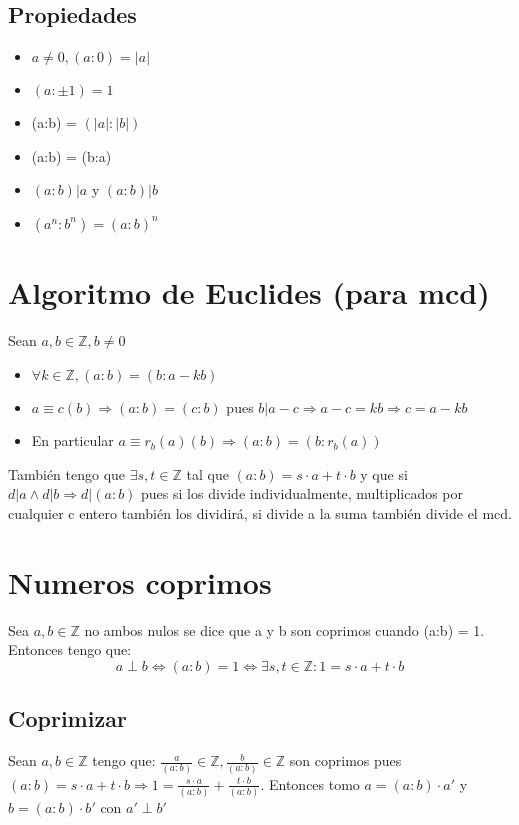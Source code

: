 \documentclass{report}
\begin{document}
\subsection{Propiedades}
\begin{itemize}
    \item $a \neq 0, (a:0) = |a|$
    \item $(a:\pm 1) = 1$
    \item (a:b) = $(|a|:|b|)$
    \item (a:b) = (b:a)
    \item $(a:b)|a$ y $(a:b)|b$
    \item $(a^n:b^n) = (a:b)^n$
\end{itemize}

\section{Algoritmo de Euclides (para mcd)}
Sean $a,b \in \mathbb{Z}, b \neq 0$
\begin{itemize}
    \item $\forall k \in \mathbb{Z}, (a:b) = (b:a-kb)$
    \item $a \equiv c (b) \Rightarrow (a:b) = (c:b)$ pues $b|a-c \Rightarrow a-c = kb \Rightarrow c = a-kb$
    \item En particular $a \equiv r_b(a) (b) \Rightarrow (a:b) = (b:r_b(a))$    
\end{itemize}
También tengo que $\exists s,t \in \mathbb{Z}$ tal que $(a:b) = s\cdot a +t\cdot b$ y que si $d|a \land d|b \Rightarrow d|(a:b)$ pues si los divide individualmente, multiplicados por cualquier c entero también los dividirá, si divide a la suma también divide el mcd.

\section{Numeros coprimos}
Sea $a,b \in \mathbb{Z}$ no ambos nulos se dice que a y b son coprimos cuando (a:b) = 1. Entonces tengo que: \begin{equation}
    a \perp b \iff (a:b) = 1 \iff \exists s,t \in \mathbb{Z}: 1 = s \cdot a + t \cdot b
\end{equation}
\subsection{Coprimizar}
Sean $a,b \in \mathbb{Z}$ tengo que:
$\frac{a}{(a:b)} \in \mathbb{Z}, \frac{b}{(a:b)} \in \mathbb{Z}$ son coprimos pues $(a:b) = s \cdot a + t \cdot b \Rightarrow 1 = \frac{s \cdot a}{(a:b)} + \frac{t \cdot b}{(a:b)}$. Entonces tomo $a = (a:b) \cdot a'$ y $b = (a:b) \cdot b'$ con $a' \perp b'$
\end{document}
